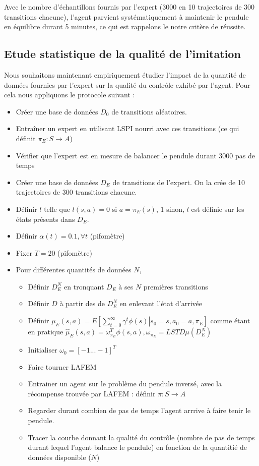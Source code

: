 \documentclass[publibook-draft]{CAp2012}
\begin{document}
Avec le nombre d'échantillons fournis par l'expert (3000 en 10 trajectoires de 300 transitions chacune), l'agent parvient systématiquement à maintenir le pendule en équilibre durant 5 minutes, ce qui est rappelons le notre critère de réussite.


\subsection{Etude statistique de la qualité de l'imitation}

Nous souhaitons maintenant empiriquement étudier l'impact de la quantité de données fournies par l'expert sur la qualité du contrôle exhibé par l'agent. Pour cela nous appliquons le protocole suivant :
\begin{itemize}
 \item Créer une base de données $D_0$ de transitions aléatoires.
 \item Entraîner un expert en utilisant LSPI nourri avec ces transitions (ce qui définit $\pi_E : S\rightarrow A$)
 \item Vérifier que l'expert est en mesure de balancer le pendule durant 3000 pas de temps
 \item Créer une base de données $D_E$ de transitions de l'expert. On la crée de 10 trajectoires de 300 transitions chacune.
 \item Définir $l$ telle que $l(s,a) = 0$ si $a=\pi_E(s)$, $1$ sinon, $l$ est définie sur les états présents dans $D_E$.
 \item Définir $\alpha(t) = 0.1,\forall t$ (pifomètre)
 \item Fixer $T=20$ (pifomètre)
 \item Pour différentes quantités de données $N$,
\begin{itemize}
   \item Définir $D_E^N$ en tronquant $D_E$ à ses $N$ premières transitions
   \item Définir $D$ à partir des de $D_E^N$ en enlevant l'état d'arrivée
   \item Définir $\mu_E(s,a) = E\left.\left[\sum\limits_{t=0}^\infty \gamma^t \phi(s)\right|s_0 = s, a_0 = a, \pi_E\right]$ comme étant en pratique $\hat\mu_E(s,a) =  \omega^T_{\pi_E}\phi(s,a), \omega_{\pi_E} = LSTD\mu(D_E^N)$
   \item Initialiser $\omega_0 = [-1...-1]^T$
   \item Faire tourner LAFEM
   \item Entrainer un agent sur le problème du pendule inversé, avec la récompense trouvée par LAFEM : définir $\pi : S\rightarrow A$
   \item Regarder durant combien de pas de temps l'agent arrrive à faire tenir le pendule.
   \item Tracer la courbe donnant la qualité du contrôle (nombre de pas de temps durant lequel l'agent balance le pendule) en fonction de la quantitié de données disponible ($N$)
\end{itemize}
\end{itemize}
\end{document}

